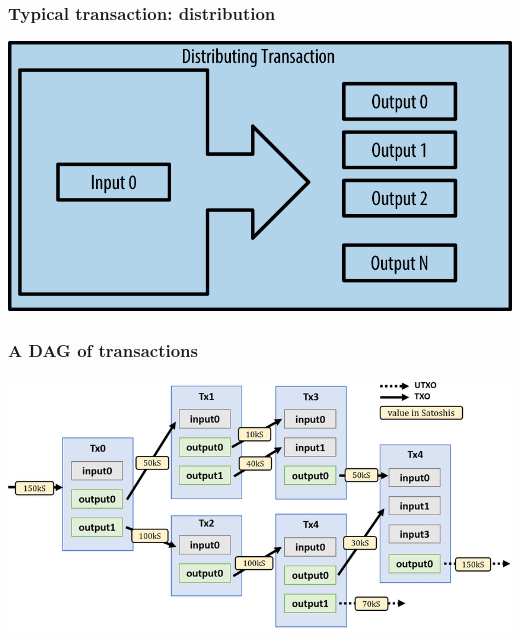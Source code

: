 \documentclass[11pt]{beamer}  %
\begin{document}
\begin{frame}\frametitle{Typical transaction: distribution}

  \begin{center}
    \includegraphics[scale=1.2,clip=false]{pictures/mbc2_0207.png}
  \end{center}

\end{frame}

\begin{frame}\frametitle{A DAG of transactions}

  \begin{center}
    \includegraphics[width=\textwidth,clip=false]{pictures/bitcoin-dag.png}
  \end{center}

\end{frame}
\end{document}
